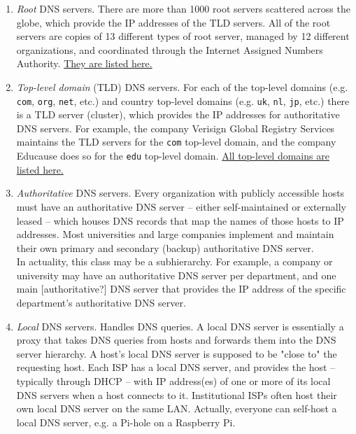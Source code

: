 \documentclass[table, xcdraw]{article}%
\begin{document}
\begin{enumerate}
    \item \emph{Root} DNS servers. There are more than 1000 root servers scattered across the globe, which provide the IP addresses of the TLD servers. All of the root servers are copies of 13 different types of root server, managed by 12 different organizations, and coordinated through the Internet Assigned Numbers Authority. \href{https://root-servers.org/}{They are listed here.}
    \item \emph{Top-level domain} (TLD) DNS servers. For each of the top-level domains (e.g. \texttt{com}, \texttt{org}, \texttt{net}, etc.) and country top-level domains (e.g. \texttt{uk}, \texttt{nl}, \texttt{jp}, etc.) there is a TLD server (cluster), which provides the IP addresses for authoritative DNS servers. For example, the company Verisign Global Registry Services maintains the TLD servers for the \texttt{com} top-level domain, and the company Educause does so for the \texttt{edu} top-level domain. \href{https://en.wikipedia.org/wiki/
List_of_Internet_top-level_domains}{All top-level domains are listed here.}
    \item \emph{Authoritative} DNS servers. Every organization with publicly accessible hosts must have an authoritative DNS server -- either self-maintained or externally leased -- which houses DNS records that map the names of those hosts to IP addresses. Most universities and large companies implement and maintain their own primary and secondary (backup) authoritative DNS server.\\
    In actuality, this class may be a subhierarchy. For example, a company or university may have an authoritative DNS server per department, and one main [authoritative?] DNS server that provides the IP address of the specific department's authoritative DNS server.
    \item[\textbullet] \emph{Local} DNS servers. Handles DNS queries. A local DNS server is essentially a proxy that takes DNS queries from hosts and forwards them into the DNS server hierarchy. A host’s local DNS server is supposed to be "close to" the requesting host. Each ISP has a local DNS server, and provides the host --typically through DHCP -- with IP address(es) of one or more of its local DNS servers when a host connects to it. Institutional ISPs often host their own local DNS server on the same LAN. Actually, everyone can self-host a local DNS server, e.g. a Pi-hole on a Raspberry Pi.
\end{enumerate}
\end{document}
